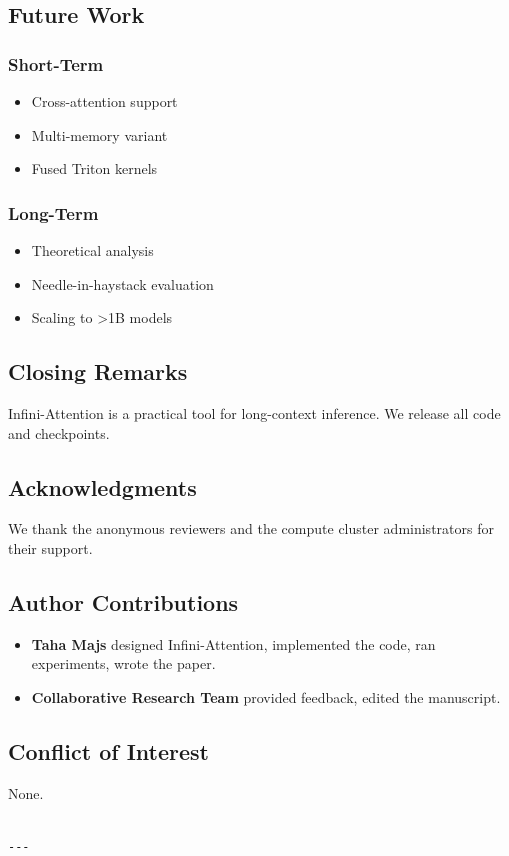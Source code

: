 \subsection{Future Work}

\subsubsection{Short-Term}
\begin{itemize}
\item Cross-attention support
\item Multi-memory variant
\item Fused Triton kernels

\end{itemize}
\subsubsection{Long-Term}
\begin{itemize}
\item Theoretical analysis
\item Needle-in-haystack evaluation
\item Scaling to \textgreater{}1B models

\end{itemize}
\subsection{Closing Remarks}

Infini-Attention is a practical tool for long-context inference. We release 
all code and checkpoints.

\subsection{Acknowledgments}

We thank the anonymous reviewers and the compute cluster administrators for their support.

\subsection{Author Contributions}

\begin{itemize}
\item \textbf{Taha Majs} designed Infini-Attention, implemented the code, ran
  experiments, wrote the paper.
\item \textbf{Collaborative Research Team} provided feedback, edited the manuscript.

\end{itemize}
\subsection{Conflict of Interest}

None.
\begin{lstlisting}

---
\end{lstlisting}